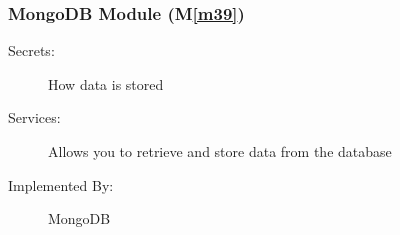 \documentclass[12pt, titlepage]{article}
\newcommand{\mref}[1]{M\ref{#1}}
\begin{document}
	
	
	
	
	
	
	\subsubsection{MongoDB Module (\mref{m39})}
	
	\begin{description}
		\item[Secrets:] How data is stored
		\item[Services:] Allows you to retrieve and store data from the database
		\item[Implemented By:] MongoDB
	\end{description}
	
\end{document}
